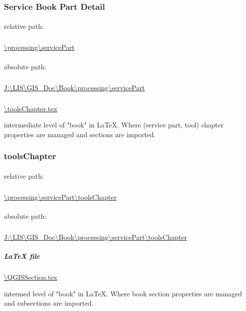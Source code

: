\documentclass[class=book , crop=false]{standalone}
\begin{document}
	\subsubsection{Service Book Part Detail}
		\paragraph{}
			relative path:
			\subparagraph{}
				\url{\processing\servicePart}
		\paragraph{}
			absolute path:
			\subparagraph{}
				\url {J:\LIS\GIS_Doc\Book\processing\servicePart}\\
			\subparagraph{}				
				\url{\toolsChapter.tex}
			
				\begin{description}
				\item  intermediate level of "book" in \LaTeX{}.  Where (service part, tool) chapter properties are managed and sections are imported.
				\end{description}
								
	\subsubsection{toolsChapter}
		\paragraph{}
		relative path:
			\subparagraph{}
			\url{ \processing\servicePart\toolsChapter}
		\paragraph{}
			absolute path:
			\subparagraph{}
				\url{J:\LIS\GIS_Doc\Book\processing\servicePart\toolsChapter}
			\subparagraph{\LaTeX{} file}
				\url{\QGISSection.tex}
				\begin {description}
				\item intermed level of "book" in \LaTeX{}.  Where book section properties are managed and subsections are imported.
				\end{description}
		
				
				
			
\end{document}
